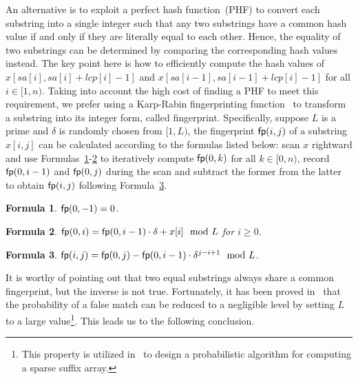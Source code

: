 \documentclass[10pt,journal,compsoc]{IEEEtran}
\newtheorem{Formula}{Formula}
\begin{document}
An alternative is to exploit a perfect hash function~(PHF) to convert each substring into a single integer such that any two substrings have a common hash value if and only if they are literally equal to each other. Hence, the equality of two substrings can be determined by comparing the corresponding hash values instead. The key point here is how to efficiently compute the hash values of $x[sa[i], sa[i] + lcp[i] - 1]$ and $x[sa[i - 1], sa[i - 1] + lcp[i] - 1]$ for all $i \in [1, n)$. Taking into account the high cost of finding a PHF to meet this requirement, we prefer using a Karp-Rabin fingerprinting function~\cite{Karp1987} to transform a substring into its integer form, called fingerprint. Specifically, suppose $L$ is a prime and $\delta$ is randomly chosen from $[1, L)$, the fingerprint ${\sf fp}(i, j)$ of a substring $x[i, j]$ can be calculated according to the formulas listed below: scan $x$ rightward and use Formulas~\ref{formula:1}-\ref{formula:2} to iteratively compute ${\sf fp}(0, k)$ for all $k \in [0, n)$, record ${\sf fp}(0, i - 1)$ and ${\sf fp}(0, j)$ during the scan and subtract the former from the latter to obtain ${\sf fp}(i, j)$ following Formula~\ref{formula:3}. 

\begin{Formula} \label{formula:1}
	${\sf fp}(0, -1) = 0$.
	
\end{Formula}

\begin{Formula} \label{formula:2}	
	${\sf fp}(0, i) = {\sf fp}(0, i - 1) \cdot {\delta} + x[i]\mod L$ for $i \ge 0$.
	
\end{Formula}

\begin{Formula} \label{formula:3}
	${\sf fp}(i, j) = {\sf fp}(0, j) - {\sf fp}(0 ,i - 1) \cdot {\delta}^{j - i + 1}\mod L$.
	
\end{Formula}

It is worthy of pointing out that two equal substrings always share a common fingerprint, but the inverse is not true. Fortunately, it has been proved in~\cite{Karp1987} that the probability of a false match can be reduced to a negligible level by setting $L$ to a large value\footnote{This property is utilized in~\cite{Bille2013} to design a probabilistic algorithm for computing a sparse suffix array. }. This leads us to the following conclusion.
\end{document}
